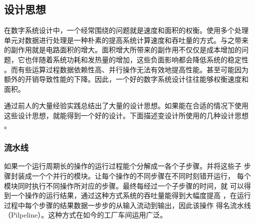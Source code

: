 \documentclass{article}
\numberwithin {equation}{section}
\begin{document}
\begin{spacing}{1.25}
  \subsection{设计思想}
    \vspace{1em}
    在数字系统设计中，一个经常围绕的问题就是速度和面积的权衡。使用多个处理
    单元对数据进行处理是一种朴素的提高系统计算速度和吞吐量的方式。与之带来
    的副作用就是电路面积的增大。面积增大所带来的副作用不仅仅是成本增加的问
    题，它也伴随着系统功耗和发热量的增加，这些负面影响都会降低系统的稳定性
    。而有些运算过程数据依赖性高、并行操作无法有效地提高性能。甚至可能因为
    额外的开销导致性能的下降。因此，一个好的数字系统设计往往能够权衡速度和
    面积。

    通过前人的大量经验实践总结出了大量的设计思想。如果能在合适的情况下使用
    这些设计思想，就能得到一个好的设计。下面描述变设计所使用的几种设计思想
    。
    \subsubsection{流水线}
      \vspace{1em}
      如果一个运行周期长的操作的运行过程能个分解成一各个子步骤。并将这些子
      步骤封装成一个个并行的模块。让每个操作的不同步骤在不同时刻错开运行，
      每个模块同时执行不同操作所对应的步骤。最终每经过一个子步骤的时间，就
      可以得到一个操作的运行结果，通过这种方式系统的吞吐量能得到大幅度提高
      ，在运行过程中每个步骤的结果数据一步步的从输入流动到输出，因此该操作
      得名流水线（Pilpeline）。这种方式在如今的工厂车间运用广泛。


\end{spacing}
\end{document}
